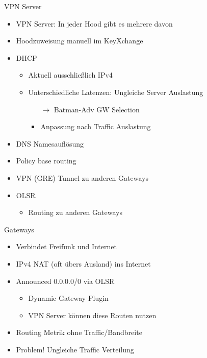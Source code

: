 \begin{frame}{VPN Server}
    \begin{itemize}
        \item VPN Server: In jeder Hood gibt es mehrere davon
        \item Hoodzuweisung manuell im KeyXchange
        \item DHCP
        \begin{itemize}
            \item Aktuell ausschließlich IPv4
            \item Unterschiedliche Latenzen: Ungleiche Server Auslastung
            \begin{itemize}
                \item[$\rightarrow$] Batman-Adv GW Selection
                \item Anpassung nach Traffic Auslastung
            \end{itemize}
        \end{itemize}
        \item DNS Namesauflösung
        \item Policy base routing
        \item VPN (GRE) Tunnel zu anderen Gateways
        \item OLSR
        \begin{itemize}
            \item Routing zu anderen Gateways
        \end{itemize}
    \end{itemize}
\end{frame}

\begin{frame}{Gateways}
    \begin{itemize}
        \item Verbindet Freifunk und Internet
        \item IPv4 NAT (oft übers Ausland) ins Internet
        \item Announced 0.0.0.0/0 via OLSR
        \begin{itemize}
            \item Dynamic Gateway Plugin
            \item VPN Server können diese Routen nutzen
        \end{itemize}
        \item Routing Metrik ohne Traffic/Bandbreite
        \item<2> {\color{red}Problem!} Ungleiche Traffic Verteilung
    \end{itemize}
\end{frame}
